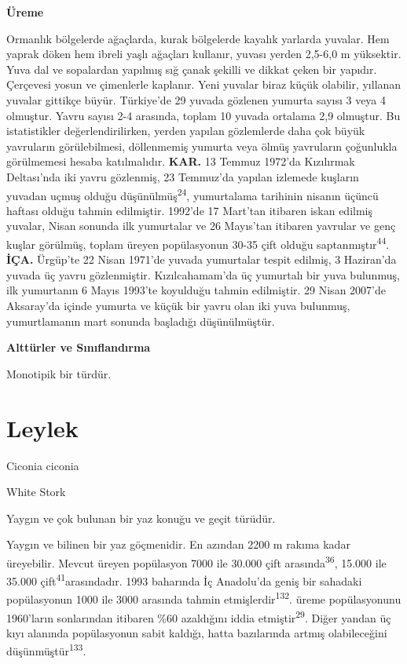 \documentclass[
  letterpaper,
  DIV=11,
  numbers=noendperiod]{scrreprt}
\begin{document}
\textbf{Üreme}

Ormanlık bölgelerde ağaçlarda, kurak bölgelerde kayalık yarlarda
yuvalar. Hem yaprak döken hem ibreli yaşlı ağaçları kullanır, yuvası
yerden 2,5-6,0 m yüksektir. Yuva dal ve sopalardan yapılmış sığ çanak
şekilli ve dikkat çeken bir yapıdır. Çerçevesi yosun ve çimenlerle
kaplanır. Yeni yuvalar biraz küçük olabilir, yıllanan yuvalar gittikçe
büyür. Türkiye'de 29 yuvada gözlenen yumurta sayısı 3 veya 4 olmuştur.
Yavru sayısı 2-4 arasında, toplam 10 yuvada ortalama 2,9 olmuştur. Bu
istatistikler değerlendirilirken, yerden yapılan gözlemlerde daha çok
büyük yavruların görülebilmesi, döllenmemiş yumurta veya ölmüş
yavruların çoğunlukla görülmemesi hesaba katılmalıdır. \textbf{KAR.} 13
Temmuz 1972'da Kızılırmak Deltası'nda iki yavru gözlenmiş, 23 Temmuz'da
yapılan izlemede kuşların yuvadan uçmuş olduğu
düşünülmüş\textsuperscript{24}, yumurtalama tarihinin nisanın üçüncü
haftası olduğu tahmin edilmiştir. 1992'de 17 Mart'tan itibaren iskan
edilmiş yuvalar, Nisan sonunda ilk yumurtalar ve 26 Mayıs'tan itibaren
yavrular ve genç kuşlar görülmüş, toplam üreyen popülasyonun 30-35 çift
olduğu saptanmıştır\textsuperscript{44}. \textbf{İÇA.} Ürgüp'te 22 Nisan
1971'de yuvada yumurtalar tespit edilmiş, 3 Haziran'da yuvada üç yavru
gözlenmiştir. Kızılcahamam'da üç yumurtalı bir yuva bulunmuş, ilk
yumurtanın 6 Mayıs 1993'te koyulduğu tahmin edilmiştir. 29 Nisan 2007'de
Aksaray'da içinde yumurta ve küçük bir yavru olan iki yuva bulunmuş,
yumurtlamanın mart sonunda başladığı düşünülmüştür.

\textbf{Alttürler ve Sınıflandırma}

Monotipik bir türdür.

\section{Leylek}\label{leylek}

Ciconia ciconia

White Stork

Yaygın ve çok bulunan bir yaz konuğu ve geçit türüdür.

Yaygın ve bilinen bir yaz göçmenidir. En azından 2200 m rakıma kadar
üreyebilir. Mevcut üreyen popülasyon 7000 ile 30.000 çift
arasında\textsuperscript{36}, 15.000 ile 35.000
çift\textsuperscript{41}arasındadır. 1993 baharında İç Anadolu'da geniş
bir sahadaki popülasyonun 1000 ile 3000 arasında tahmin
etmişlerdir\textsuperscript{132}. üreme popülasyonunu 1960'ların
sonlarından itibaren \%60 azaldığını iddia etmiştir\textsuperscript{29}.
Diğer yandan üç kıyı alanında popülasyonun sabit kaldığı, hatta
bazılarında artmış olabileceğini düşünmüştür\textsuperscript{133}.
\end{document}
